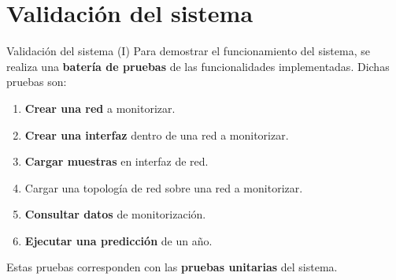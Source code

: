 \documentclass[aspectratio=169,xcolor=dvipsnames]{beamer}
\begin{document}
	
	\section{Validación del sistema}
	
	\begin{frame}{Validación del sistema (I)}
		Para demostrar el funcionamiento del sistema, se realiza una \textbf{batería de pruebas} de las funcionalidades implementadas. Dichas pruebas son:
		
		\begin{enumerate}
			\item \textbf{Crear una red} a monitorizar.
			
			\item \textbf{Crear una interfaz} dentro de una red a monitorizar.
			
			\item \textbf{Cargar muestras} en interfaz de red.
			
			\item Cargar una topología de red sobre una red a monitorizar.
			
			\item \textbf{Consultar datos} de monitorización.
			
			\item \textbf{Ejecutar una predicción} de un año.
		\end{enumerate}
	
	\vspace{12px}
	
	Estas pruebas corresponden con las \textbf{pruebas unitarias} del sistema.
		
	\end{frame}
\end{document}
